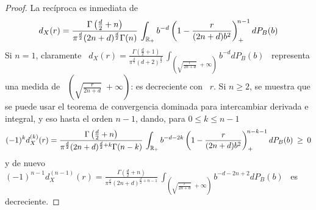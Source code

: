 \begin{proof}
  La rec\'iproca es inmediata de
  \[
  d_X(r) = \frac{\Gamma\left( \frac{d}{2}  + n \right)}{\pi^{\frac{d}{2}} (2 n +
    d)^{\frac{d}{2}} \Gamma(n)} \, \int_{\mathbb{R}_+}  b^{-d} \left( 1 - \frac{r}{(2
      n + d) b^2} \right)_+^{\! n - 1} dP_B(b)
  \]
  Si  $n   =  1$,  claramente  \  $\displaystyle   d_X(r)  =  \frac{\Gamma\left(
      \frac{d}{2}   +  1   \right)}{\pi^{\frac{d}{2}}   (d+2)^{\frac{d}{2}}}  \,
  \int_{\left( \sqrt{\frac{r}{2  n + d}}  \; +\infty \right)} b^{-d}  dP_B(b)$ \
  representa  una  medida de  \  $\left( \sqrt{\frac{r}{2  n  +  d}} \;  +\infty
  \right)$: es decreciente con \ $r$. Si $n \ge 2$, se muestra que se puede usar
  el teorema de  convergencia dominada para intercambiar derivada  e integral, y
  eso hasta el orden $n-1$, dando, para $0 \le k \le n-1$
 \[
 (-1)^k     d_X^{(k)}(r)     =     \frac{\Gamma\left(    \frac{d}{2}     +     n
   \right)}{\pi^{\frac{d}{2}}   (2  n   +  d)^{\frac{d}{2}+k}   \Gamma(n-k)}  \,
 \int_{\mathbb{R}_+} b^{-d-2k} \left( 1 - \frac{r}{(2 n + d) b^2} \right)_+^{\! n - k
   - 1} dP_B(b) \: \ge \: 0
  \]
  y  de nuevo  \ $\displaystyle  (-1)^{n-1} d_X^{(n-1)}(r)  = \frac{\Gamma\left(
      \frac{d}{2} + n \right)}{\pi^{\frac{d}{2}} (2 n + d)^{\frac{d}{2}+n-1}} \,
  \int_{\left( \sqrt{\frac{r}{2 n + d}} \; +\infty \right)} b^{-d-2n+2} dP_B(b)$
  \ es decreciente.


\end{proof}

